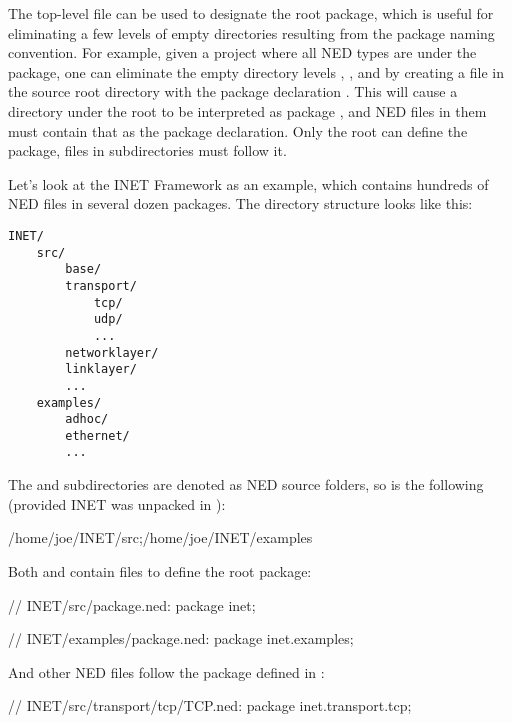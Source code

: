 The top-level  file can be used to designate the root
package, which is useful for eliminating a few levels of empty directories
resulting from the package naming convention. For example, given a project where
all NED types are under the  package, one can eliminate the
empty directory levels , , and  by creating a
 file in the source root directory with the package
declaration . This will cause a directory 
under the root to be interpreted as package , and
NED files in them must contain that as the package declaration. Only the root
 can define the package,  files in
subdirectories must follow it.

Let's look at the INET Framework as an example, which contains hundreds of NED
files in several dozen packages. The directory structure looks like this:

\begin{Verbatim}
INET/
    src/
        base/
        transport/
            tcp/
            udp/
            ...
        networklayer/
        linklayer/
        ...
    examples/
        adhoc/
        ethernet/
        ...
\end{Verbatim}

The  and  subdirectories are denoted as NED source
folders, so  is the following (provided INET was unpacked in
):

\begin{filelisting}
/home/joe/INET/src;/home/joe/INET/examples
\end{filelisting}

Both  and  contain  files to define the root package:

\begin{ned}
// INET/src/package.ned:
package inet;
\end{ned}

\begin{ned}
// INET/examples/package.ned:
package inet.examples;
\end{ned}

And other NED files follow the package defined in :

\begin{ned}
// INET/src/transport/tcp/TCP.ned:
package inet.transport.tcp;
\end{ned}


